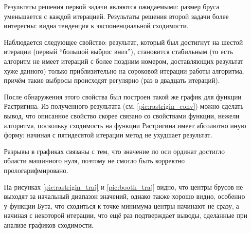 Результаты решения первой задачи являются ожидаемыми: размер бруса уменьшается с каждой итерацией. Результаты решения второй задачи более интересны: видна тенденция к экспоненциальной сходимости.

Наблюдается следующее свойство: результат, который был достигнут на шестой итерации (первый ``большой выброс вниз''), становится стабильным (то есть алгоритм не имеет итераций с более поздним номером, доставляющих результат хуже данного) только приблизительно на сороковой итерации работы алгоритма, причём такие выбросы происходят регулярно (раз в двадцать итераций). 

После обнаружения этого свойства был построен такой же график для функции Растригина. Из полученного результата (см. \ref{pic:rastrigin_conv}) можно сделать вывод, что описанное свойство скорее связано со свойствами функции, нежели алгоритма, поскольку сходимость на функции Растригина имеет абсолютно иную форму: начиная с пятидесятой итерации метод не ухудшает результат.

Разрывы в графиках связаны с тем, что значение по оси ординат достигло области машинного нуля, поэтому не смогло быть корректно прологарифмировано.

На рисунках \ref{pic:rastrigin_traj} и \ref{pic:booth_traj} видно, что центры брусов не выходят за начальный диапазон значений, однако также хорошо видно, особенно у функции Бута, что сходиться к точке минимума центры начинают не сразу, а начиная с некоторой итерации, что ещё раз подтверждает выводы, сделанные при анализе графиков сходимости.